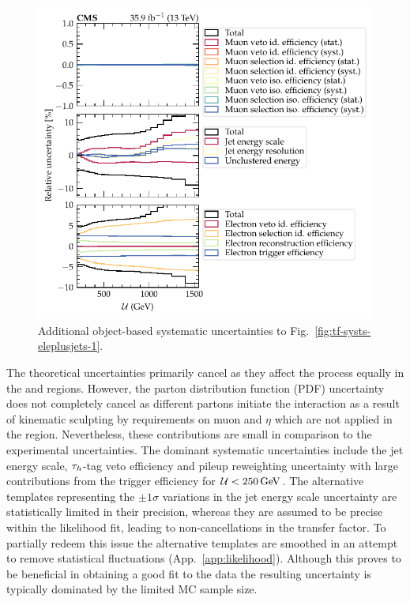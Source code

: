 \begin{figure}
    \centering
    \includegraphics{chapters/042_backgrounds/images/tf_wj_ele_met_systs2.pdf}
    \caption[Object-based uncertainties on the transfer factors]{
        Additional object-based systematic uncertainties to Fig.~\ref{fig:tf-systs-eleplusjets-1}.
    }
    \label{fig:tf-systs-eleplusjets-2}
\end{figure}
%
The theoretical uncertainties primarily cancel as they affect the \IWj process equally in the \metplusjets and \muplusjets regions. However, the parton distribution function (PDF) uncertainty does not completely cancel as different partons initiate the interaction as a result of kinematic sculpting by requirements on muon \pt and $\eta$ which are not applied in the \metplusjets region. Nevertheless, these contributions are small in comparison to the experimental uncertainties. The dominant systematic uncertainties include the jet energy scale, $\tau_h$-tag veto efficiency and pileup reweighting uncertainty with large contributions from the \ptmiss trigger efficiency for ${\mathcal{U}<\SI{250}{GeV}}$. The alternative templates representing the $\pm 1\sigma$ variations in the jet energy scale uncertainty are statistically limited in their precision, whereas they are assumed to be precise within the likelihood fit, leading to non-cancellations in the transfer factor. To partially redeem this issue the alternative templates are smoothed in an attempt to remove statistical fluctuations (App.~\ref{app:likelihood}). Although this proves to be beneficial in obtaining a good fit to the data the resulting uncertainty is typically dominated by the limited MC sample size.

